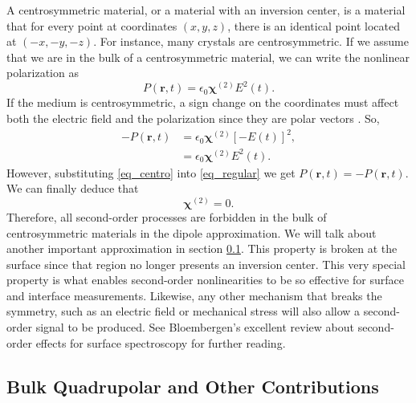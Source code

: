 A centrosymmetric material, or a material with an inversion center, is a
material that for every point at coordinates $(x,y,z)$, there is an identical
point located at $(-x,-y,-z)$. For instance, many crystals are centrosymmetric.
If we assume that we are in the bulk of a centrosymmetric material, we can write
the nonlinear polarization as
\begin{equation}\label{eq_regular}
{P}(\mathbf{r},t) = \epsilon_{0}\boldsymbol{\chi}^{(2)}{E}^{2}(t).
\end{equation}
If the medium is centrosymmetric, a sign change on the coordinates must affect
both the electric field and the polarization since they are polar vectors
\cite{jacksonbook}. So,
\begin{align}\label{eq_centro}
-{P}(\mathbf{r},t)
&= \epsilon_{0}\boldsymbol{\chi}^{(2)}\left[-{E}(t)\right]^{2},\\
&= \epsilon_{0}\boldsymbol{\chi}^{(2)}{E}^{2}(t).
\end{align}
However, substituting \eqref{eq_centro} into \eqref{eq_regular} we get
${P}(\mathbf{r},t) = -{P}(\mathbf{r},t)$. We can finally deduce that
\begin{equation}
\boldsymbol{\chi}^{(2)} = 0.
\end{equation}
Therefore, all second-order processes are forbidden in the bulk of
centrosymmetric materials in the dipole approximation. We will talk about
another important approximation in section \ref{chap_theory_quad}. This property
is broken at the surface since that region no longer presents an inversion
center.  This very special property is what enables second-order nonlinearities
to be so effective for surface and interface measurements. Likewise, any other
mechanism that breaks the symmetry, such as an electric field or mechanical
stress will also allow a second-order signal to be produced. See Bloembergen's
\cite{bloembergen1999surface} excellent review about second-order effects for
surface spectroscopy for further reading.



\subsection{Bulk Quadrupolar and Other Contributions}\label{chap_theory_quad}

